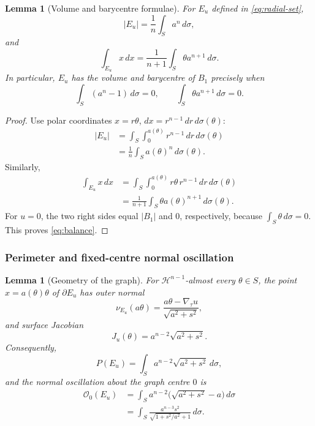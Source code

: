 \documentclass[11pt]{amsart}
\newtheorem{lemma}[theorem]{Lemma}
\theoremstyle{definition}
\newcommand{\Hn}{\mathcal H^{n-1}}
\newcommand{\Per}{P}
\newcommand{\osc}{\mathcal O}
\begin{document}
\begin{lemma}[Volume and barycentre formulae]\label{lem:volume-bary}
For \(E_u\) defined in \eqref{eq:radial-set},
\[
   |E_u|=\frac1n\int_Sa^n\,d\sigma,
\tag{3.4}\label{eq:volume-graph}
\]
and
\[
   \int_{E_u}x\,dx=\frac1{n+1}\int_S\theta a^{n+1}\,d\sigma.
\tag{3.5}\label{eq:bary-graph}
\]
In particular, \(E_u\) has the volume and barycentre of \(B_1\) precisely when
\[
   \int_S(a^n-1)\,d\sigma=0,
   \qquad
   \int_S\theta a^{n+1}\,d\sigma=0.
\tag{3.6}\label{eq:balance}
\]
\end{lemma}

\begin{proof}
Use polar coordinates \(x=r\theta\), \(dx=r^{n-1}\,dr\,d\sigma(\theta)\):
\[
\begin{aligned}
   |E_u|
   &=\int_S\int_0^{a(\theta)}r^{n-1}\,dr\,d\sigma(\theta)  \\
   &=\frac1n\int_Sa(\theta)^n\,d\sigma(\theta).
\end{aligned}
\]
Similarly,
\[
\begin{aligned}
   \int_{E_u}x\,dx
   &=\int_S\int_0^{a(\theta)}r\theta\,r^{n-1}\,dr\,d\sigma(\theta) \\
   &=\frac1{n+1}\int_S\theta a(\theta)^{n+1}\,d\sigma(\theta).
\end{aligned}
\]
For \(u=0\), the two right sides equal \(|B_1|\) and \(0\), respectively,
because \(\int_S\theta\,d\sigma=0\).  This proves \eqref{eq:balance}.
\end{proof}

\subsubsection{Perimeter and fixed-centre normal oscillation}

\begin{lemma}[Geometry of the graph]\label{lem:graph-geometry}
For \(\Hn\)-almost every \(\theta\in S\), the point
\(x=a(\theta)\theta\) of \(\partial E_u\) has outer normal
\[
   \nu_{E_u}(a\theta)
   =\frac{a\theta-\nabla_\tau u}{\sqrt{a^2+s^2}},
\tag{3.7}\label{eq:graph-normal}
\]
and surface Jacobian
\[
   J_u(\theta)=a^{n-2}\sqrt{a^2+s^2}.
\tag{3.8}\label{eq:graph-jac}
\]
Consequently,
\[
   \Per(E_u)=\int_Sa^{n-2}\sqrt{a^2+s^2}\,d\sigma,
\tag{3.9}\label{eq:graph-perimeter}
\]
and the normal oscillation about the graph centre \(0\) is
\[
\begin{aligned}
   \osc_0(E_u)
   &=\int_Sa^{n-2}\bigl(\sqrt{a^2+s^2}-a\bigr)\,d\sigma \\
   &=\int_S
       \frac{a^{n-3}s^2}{\sqrt{1+s^2/a^2}+1}\,d\sigma.
\end{aligned}
\tag{3.10}\label{eq:graph-osc}
\]
\end{lemma}
\end{document}
